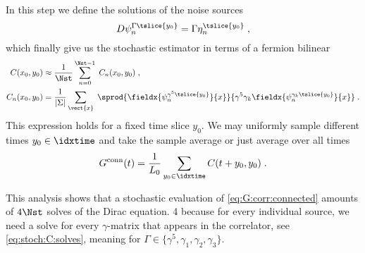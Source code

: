 In this step we define the solutions of the noise sources
\begin{equation} \label{eq:stoch:C:solves}
D \psi_{n}^{\Gamma \tslice{y_0}} = \Gamma \eta_n^{\tslice{y_0}} \;,
\end{equation}
which finally give us the stochastic estimator in terms of a fermion bilinear
\begin{align} \label{eq:stoch:C:full:final}
C(x_0, y_0)
&\approx \frac{1}{\Nst} \sum_{n=0}^{\Nst-1} \; C_n(x_0, y_0) \;, \\
C_n(x_0, y_0)
&= \frac{1}{ \lvert \Sigma \rvert } \sum_{\vect{x}} \;
\sprod{
  \fieldx{\psi_{n}^{\gamma^{5} \tslice{y_0}}}{x}
}{
  \gamma^{5}
  \gamma_k
  \fieldx{\psi_{n}^{\gamma_k \tslice{y_0}}}{x}
} \;.
\end{align}
This expression holds for a fixed time slice $y_0$.
We may uniformly sample different times $y_0 \in \idxtime$ and take the sample average or just average over all times
\begin{equation}
G^{\text{conn}}(t) = \frac{1}{L_0} \sum_{y_0 \in \idxtime}  C(t + y_0, y_0) \;.
\end{equation}

This analysis shows that a stochastic evaluation of \cref{eq:G:corr:connected} amounts of $4 \Nst$ solves of the Dirac equation. \num{4} because for every individual source, we need a solve for every $\gamma$-matrix that appears in the correlator, see \cref{eq:stoch:C:solves}, meaning for $\Gamma \in \{ \gamma^{5}, \gamma_1, \gamma_2, \gamma_3 \}$.





